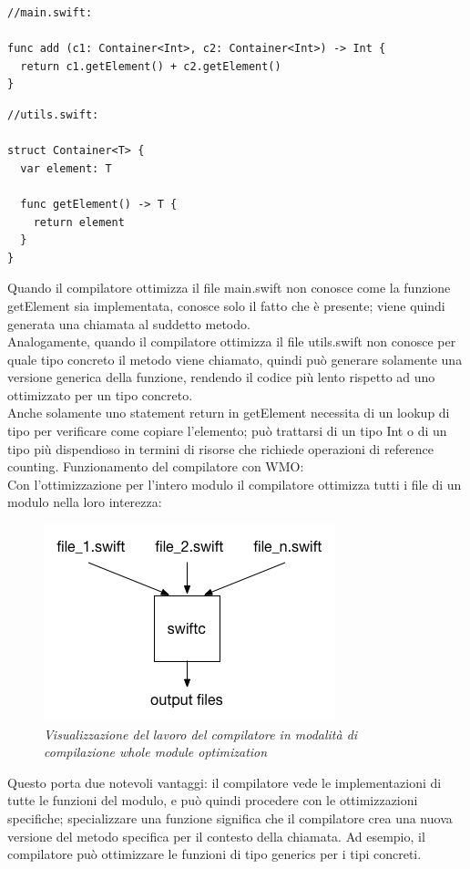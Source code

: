 \begin{lstlisting}
//main.swift:

func add (c1: Container<Int>, c2: Container<Int>) -> Int {
  return c1.getElement() + c2.getElement()
}
\end{lstlisting}
\begin{lstlisting}
//utils.swift:

struct Container<T> {
  var element: T

  func getElement() -> T {
    return element
  }
}
\end{lstlisting}
Quando il compilatore ottimizza il file main.swift non conosce come la funzione getElement sia implementata, conosce solo il fatto che è presente; viene quindi generata una chiamata al suddetto metodo.\\
Analogamente, quando il compilatore ottimizza il file utils.swift non conosce per quale tipo concreto il metodo viene chiamato, quindi può generare solamente una versione generica della funzione, rendendo il codice più lento rispetto ad uno ottimizzato per un tipo concreto.\\
Anche solamente uno statement return in getElement necessita di un lookup di tipo per verificare come copiare l'elemento; può trattarsi di un tipo Int o di un tipo più dispendioso in termini di risorse che richiede operazioni di reference counting.
Funzionamento del compilatore con WMO:\\
Con l'ottimizzazione per l'intero modulo il compilatore ottimizza tutti i file di un modulo nella loro interezza: 
\begin{figure}[H]
      \centering
      \includegraphics[scale=0.80]{immagini/wmo.png}
            \vspace{0.8cm}
            \caption{\textit{Visualizzazione del lavoro del compilatore in modalità di compilazione whole module optimization}}
\end{figure}
Questo porta due notevoli vantaggi: il compilatore vede le implementazioni di tutte le funzioni del modulo, e può quindi procedere con le ottimizzazioni specifiche; specializzare una funzione significa che il compilatore crea una nuova versione del metodo specifica per il contesto della chiamata. Ad esempio, il compilatore può ottimizzare le funzioni di tipo generics per i tipi concreti.\\
